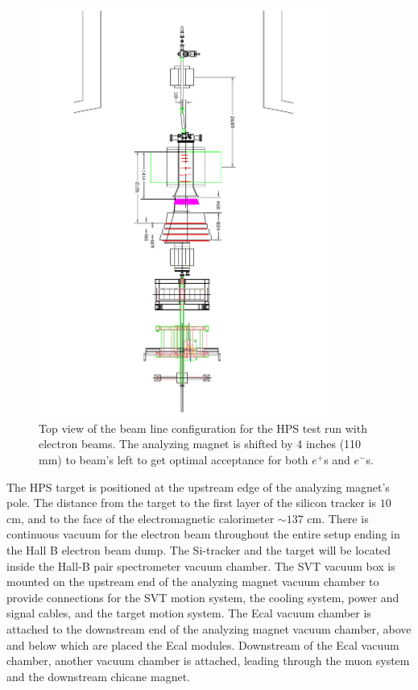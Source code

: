 \begin{figure}[t]
\includegraphics[angle=180., width=0.85\textwidth]{beamline/HPS12_66840e051XX_PLAN.pdf}
\caption{\small{Top view of the beam line configuration for the HPS test run with electron beams. The analyzing magnet is shifted by 4 inches 
(110 mm) to beam's left to get optimal acceptance for both $e^+$s and $e^-$s.}}\label{fig:ebeamt}
\end{figure}

 
The HPS target is positioned at the upstream edge of the analyzing magnet's pole. The distance from the target to the first layer of the 
silicon tracker is $10$ cm, and to the face of the electromagnetic calorimeter $\sim 137$ cm. There is continuous vacuum for the electron 
beam throughout the entire setup ending in the Hall B electron beam dump. The Si-tracker and the target will be located inside the Hall-B 
pair spectrometer vacuum chamber. The SVT vacuum box is mounted on the upstream end of the analyzing magnet vacuum chamber to provide 
connections for the SVT motion system, the cooling system, power and signal cables, and the target motion system. The Ecal vacuum chamber 
is attached to the downstream end of the analyzing magnet vacuum chamber, above and below which are placed the Ecal modules. Downstream of 
the Ecal vacuum chamber, another vacuum chamber is attached, leading through the muon system and the downstream chicane magnet.


